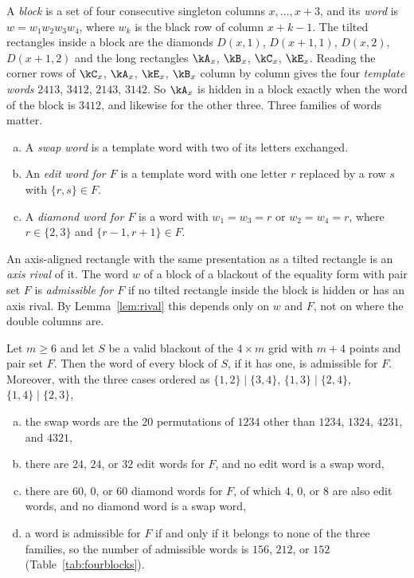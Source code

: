 A \emph{block} is a set of four consecutive singleton columns $x,\ldots,x+3$, and its \emph{word} is $w=w_1w_2w_3w_4$, where $w_k$ is the black row of column $x+k-1$. The tilted rectangles inside a block are the diamonds $D(x,1)$, $D(x+1,1)$, $D(x,2)$, $D(x+1,2)$ and the long rectangles $\kA_x$, $\kB_x$, $\kC_x$, $\kE_x$. Reading the corner rows of $\kC_x$, $\kA_x$, $\kE_x$, $\kB_x$ column by column gives the four \emph{template words} $2413$, $3412$, $2143$, $3142$. So $\kA_x$ is hidden in a block exactly when the word of the block is $3412$, and likewise for the other three. Three families of words matter.
\begin{enumerate}[(a)]
\item A \emph{swap word} is a template word with two of its letters exchanged.
\item An \emph{edit word for $F$} is a template word with one letter $r$ replaced by a row $s$ with $\{r,s\}\in F$.
\item A \emph{diamond word for $F$} is a word with $w_1=w_3=r$ or $w_2=w_4=r$, where $r\in\{2,3\}$ and $\{r-1,r+1\}\in F$.
\end{enumerate}
An axis-aligned rectangle with the same presentation as a tilted rectangle is an \emph{axis rival} of it. The word $w$ of a block of a blackout of the equality form with pair set $F$ is \emph{admissible for $F$} if no tilted rectangle inside the block is hidden or has an axis rival. By Lemma~\ref{lem:rival} this depends only on $w$ and $F$, not on where the double columns are.

\begin{lemma}\label{lem:blocks}
Let $m\ge6$ and let $S$ be a valid blackout of the $4\times m$ grid with $m+4$ points and pair set $F$. Then the word of every block of $S$, if it has one, is admissible for $F$. Moreover, with the three cases ordered as $\{1,2\}\mid\{3,4\}$, $\{1,3\}\mid\{2,4\}$, $\{1,4\}\mid\{2,3\}$,
\begin{enumerate}[(a)]
\item the swap words are the $20$ permutations of $1234$ other than $1234$, $1324$, $4231$, and $4321$,
\item there are $24$, $24$, or $32$ edit words for $F$, and no edit word is a swap word,
\item there are $60$, $0$, or $60$ diamond words for $F$, of which $4$, $0$, or $8$ are also edit words, and no diamond word is a swap word,
\item a word is admissible for $F$ if and only if it belongs to none of the three families, so the number of admissible words is $156$, $212$, or $152$ (Table~\ref{tab:fourblocks}).
\end{enumerate}
\end{lemma}

